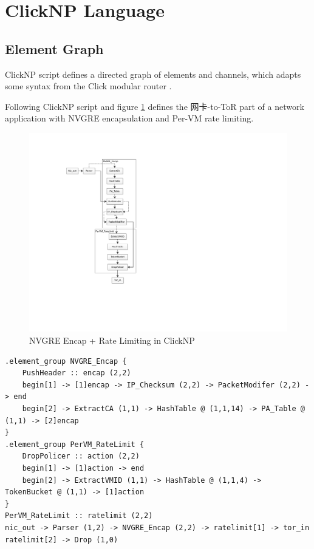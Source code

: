 \section{ClickNP Language}
\label{clicknp:sec:language}

\subsection{Element Graph}

ClickNP script defines a directed graph of elements and channels, which adapts some syntax from the Click modular router \cite{kohler2000click}.

Following ClickNP script and figure \ref{clicknp:fig:ClickNPScriptExample} defines the 网卡-to-ToR part of a network application with NVGRE encapsulation and Per-VM rate limiting.

\begin{figure}[!t]
	\centering
	\includegraphics[width=1.0\columnwidth]{image/ApplicationExample}
	\vspace{-0.25in}
	\caption{NVGRE Encap + Rate Limiting in ClickNP}
	\vspace{-0.15in}
	\label{clicknp:fig:ClickNPScriptExample}
\end{figure}

\begin{lstlisting}
.element_group NVGRE_Encap {
    PushHeader :: encap (2,2)
    begin[1] -> [1]encap -> IP_Checksum (2,2) -> PacketModifer (2,2) -> end
    begin[2] -> ExtractCA (1,1) -> HashTable @ (1,1,14) -> PA_Table @ (1,1) -> [2]encap
}
.element_group PerVM_RateLimit {
    DropPolicer :: action (2,2)
    begin[1] -> [1]action -> end
    begin[2] -> ExtractVMID (1,1) -> HashTable @ (1,1,4) -> TokenBucket @ (1,1) -> [1]action
}
PerVM_RateLimit :: ratelimit (2,2)
nic_out -> Parser (1,2) -> NVGRE_Encap (2,2) -> ratelimit[1] -> tor_in
ratelimit[2] -> Drop (1,0)
\end{lstlisting}

